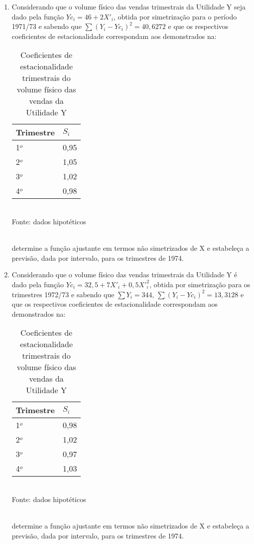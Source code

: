 \begin{enumerate}[resume]
\item Considerando que o volume físico das vendas trimestrais da Utilidade Y seja dado pela função $Yc_{i} = 46 + 2X'_{i}$, obtida por simetrização para o período 1971/73 e sabendo que $\sum (Y_{i} - Yc_{i} )^2 = 40,6272$ e que os respectivos coeficientes de estacionalidade correspondam aos demonstrados na:
	\begin{table}[!htb]
	\centering
 	\caption{Coeficientes de estacionalidade trimestrais do volume físico das vendas da Utilidade Y}
	\vspace{0.5cm}
	\begin{tabular}{ll}
	Trimestre & $S_{i}$ \\
	\hline 
	1$^o$ & 0,95 \\
	2$^o$ & 1,05 \\
	3$^o$ & 1,02 \\
	4$^o$ & 0,98 \\	
	\end{tabular}\\
	Fonte: dados hipotéticos
	\end{table}					
	\\
	determine a função ajustante em termos não simetrizados de X e estabeleça a previsão, dada por intervalo, para os trimestres de 1974.

\item Considerando que o volume físico das vendas trimestrais da Utilidade Y é dado pela função $Yc_{i} = 32,5 + 7X'_{i} + 0,5X'^2_{i}$, obtida por simetrização para os trimestres 1972/73 e sabendo que $\sum Y_{i} = 344$, $\sum (Y_{i} - Yc_{i} )^2 = 13,3128$ e que os respectivos coeficientes de estacionalidade correspondam aos demonstrados na:
	\begin{table}[!htb]
	\centering
 	\caption{Coeficientes de estacionalidade trimestrais do volume físico das vendas da Utilidade Y}
	\vspace{0.5cm}
	\begin{tabular}{ll}
	Trimestre & $S_{i}$ \\
	\hline 
	1$^o$ & 0,98 \\
	2$^o$ & 1,02 \\
	3$^o$ & 0,97 \\
	4$^o$ & 1,03 \\	
	\end{tabular}\\
	Fonte: dados hipotéticos
	\end{table}					
	\\
	determine a função ajustante em termos não simetrizados de X e estabeleça a previsão, dada por intervalo, para os trimestres de 1974.
	

\end{enumerate}
